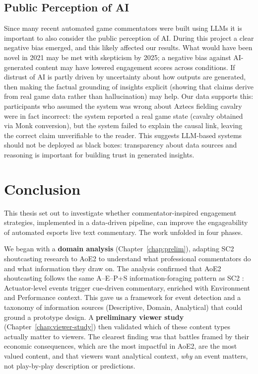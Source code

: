 \subsection{Public Perception of AI}
Since many recent automated game commentators were built using LLMs \cite{wang2024,cook2024} it is important to also consider the public perception of AI. During this project a clear negative bias emerged, and this likely affected our results. What would have been novel in 2021 may be met with skepticism by 2025; a negative bias against AI-generated content may have lowered engagement scores across conditions. If distrust of AI is partly driven by uncertainty about how outputs are generated, then making the factual grounding of insights explicit (showing that claims derive from real game data rather than hallucination) may help. Our data supports this: participants who assumed the system was wrong about Aztecs fielding cavalry were in fact incorrect: the system reported a real game state (cavalry obtained via Monk conversion), but the system failed to explain the causal link, leaving the correct claim unverifiable to the reader. This suggests LLM-based systems should not be deployed as black boxes: transparency about data sources and reasoning is important for building trust in generated insights.

\section{Conclusion}
\label{sec:conclusion}

This thesis set out to investigate whether commentator-inspired engagement strategies, implemented in a data-driven pipeline, can improve the engageability of automated esports live text commentary. The work unfolded in four phases.

We began with a \textbf{domain analysis} (Chapter~\ref{chap:prelim}), adapting SC2 shoutcasting research to AoE2 to understand what professional commentators do and what information they draw on. The analysis confirmed that AoE2 shoutcasting follows the same A--E--P+S information-foraging pattern as SC2 \cite{dodge2018}: Actuator-level events trigger cue-driven commentary, enriched with Environment and Performance context. This gave us a framework for event detection and a taxonomy of information sources (Descriptive, Domain, Analytical) that could ground a prototype design. A \textbf{preliminary viewer study} (Chapter~\ref{chap:viewer-study}) then validated which of these content types actually matter to viewers. The clearest finding was that battles framed by their economic consequences, which are the most impactful in AoE2, are the most valued content, and that viewers want analytical context, \textit{why} an event matters, not play-by-play description or predictions.

